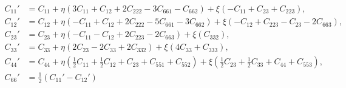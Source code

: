 \documentclass[showpacs,aps,floatfix,prb,reprint,superscriptaddress]{revtex4-1}
\begin{document}
 \begin{widetext}
\begin{subequations}
\label{eqn:Cprime_hexagonal} 
\begin{align}
        C_{11}' &=C_{11} + \eta \left(3C_{11} + C_{12} + 2C_{222} - 3C_{661} - C_{662}\right) + \xi \left(-C_{11} + C_{23} + C_{223}\right),\\
        C_{12}' &=C_{12} + \eta \left(-C_{11} + C_{12} + 2C_{222} -5C_{661} - 3C_{662}\right) + \xi \left(-C_{12} + C_{223} - C_{23} - 2C_{663}\right),\\
				C_{23}' &=C_{23} + \eta \left(-C_{11}-C_{12}+2C_{223}-2C_{663} \right) + \xi \left(C_{332}\right),\\
				C_{33}' &=C_{33} + \eta \left(2C_{23}-2C_{33}+2C_{332} \right) + \xi \left(4C_{33}+C_{333}\right),\\
				C_{44}' &=C_{44} + \eta \left(\frac{1}{2} C_{11} + \frac{1}{2} C_{12} + C_{23} + C_{551} + C_{552} \right) + \xi \left(\frac{1}{2} C_{23} + \frac{1}{2} C_{33} + C_{44} + C_{553}\right),\\
				C_{66}' &=\frac{1}{2} \left(C_{11}'-C_{12}'\right)
\end{align}
\end{subequations}
\end{widetext} 














\end{document}
